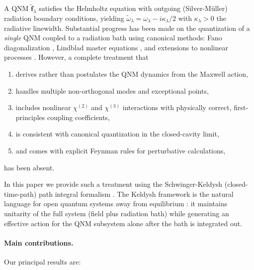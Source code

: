 \documentclass[12pt]{article}
\begin{document}
A QNM $\tilde{\mathbf{f}}_\lambda$ satisfies the Helmholtz equation with
outgoing (Silver-M\"{u}ller) radiation boundary conditions, yielding
$\tilde{\omega}_\lambda=\omega_\lambda-i\kappa_\lambda/2$ with
$\kappa_\lambda>0$ the radiative linewidth.  Substantial progress has been
made on the quantization of a \emph{single} QNM coupled to a radiation
bath using canonical methods: Fano diagonalization \cite{Franke2019},
Lindblad master equations \cite{Ren2021}, and extensions to nonlinear
processes \cite{Franke2020}.  However, a complete treatment that
\begin{enumerate}
  \item derives rather than postulates the QNM dynamics from the Maxwell action,
  \item handles multiple non-orthogonal modes and exceptional points,
  \item includes nonlinear $\chi^{(2)}$ and $\chi^{(3)}$ interactions with
        physically correct, first-principles coupling coefficients,
  \item is consistent with canonical quantization in the closed-cavity limit,
  \item and comes with explicit Feynman rules for perturbative calculations,
\end{enumerate}
has been absent.

In this paper we provide such a treatment using the
Schwinger-Keldysh (closed-time-path) path integral formalism
\cite{Schwinger1961,Keldysh1965,Sieberer2016}.  The Keldysh framework is
the natural language for open quantum systems away from equilibrium
\cite{Caldeira1983,Feynman1963}: it maintains unitarity of the full
system (field plus radiation bath) while generating an effective action
for the QNM subsystem alone after the bath is integrated out.

\paragraph{Main contributions.}  Our principal results are:
\end{document}
